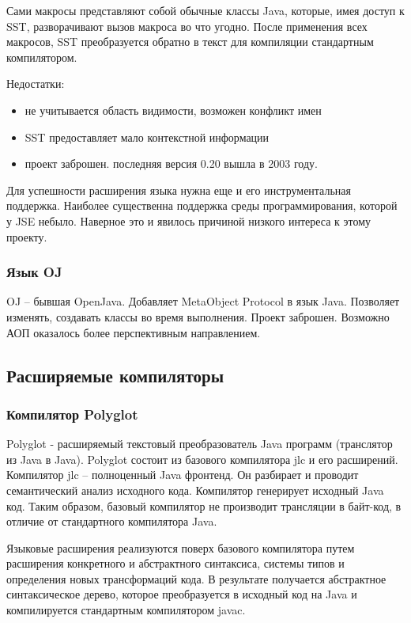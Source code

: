 \documentclass[a4paper,12pt]{article}
\begin{document}
Сами макросы представляют собой обычные классы Java, которые, имея доступ к
SST, разворачивают вызов макроса во что угодно. После применения всех макросов,
SST преобразуется обратно в текст для компиляции стандартным компилятором.

Недостатки:
\begin{itemize}
 \item не учитывается область видимости, возможен конфликт имен
 \item SST предоставляет мало контекстной информации
 \item проект заброшен. последняя версия 0.20 вышла в 2003 году.
\end{itemize}
Для успешности расширения языка нужна еще и его инструментальная поддержка.
Наиболее существенна поддержка среды программирования, которой у JSE небыло.
Наверное это и явилось причиной низкого интереса к этому проекту.

\subsubsection*{Язык OJ}
OJ -- бывшая OpenJava. Добавляет MetaObject Protocol в язык Java.
Позволяет изменять, создавать классы во время выполнения.
Проект заброшен. Возможно АОП оказалось более перспективным направлением.

\subsection{Расширяемые компиляторы}
\label{extcomp}
\subsubsection*{Компилятор Polyglot}
Polyglot - расширяемый текстовый преобразователь Java программ (транслятор из
Java в Java). Polyglot состоит из базового компилятора jlc и его расширений.
Компилятор jlc -- полноценный Java фронтенд. Он разбирает и проводит
семантический анализ исходного кода. Компилятор генерирует исходный Java код.
Таким образом, базовый компилятор не производит трансляции в байт-код, в
отличие от стандартного компилятора Java.

Языковые расширения реализуются поверх базового компилятора путем расширения
конкретного и абстрактного синтаксиса, системы типов и определения новых
трансформаций кода. В результате получается абстрактное синтаксическое дерево,
которое преобразуется в исходный код на Java и компилируется стандартным
компилятором javac.
\end{document}
